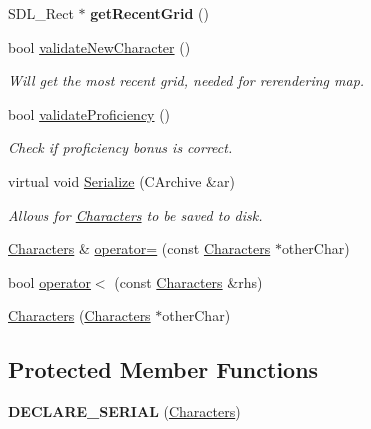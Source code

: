 \begin{DoxyCompactItemize}
S\+D\+L\+\_\+\+Rect $\ast$ {\bfseries get\+Recent\+Grid} ()
\item 
bool \hyperlink{class_characters_a1273e2d7fe2e959cd3ed513c5717f6b7}{validate\+New\+Character} ()
\begin{DoxyCompactList}\small\item\em Will get the most recent grid, needed for rerendering map. \end{DoxyCompactList}\item 
\hypertarget{class_characters_a8a13cb967bd25662f86eac505e3e874a}{}\label{class_characters_a8a13cb967bd25662f86eac505e3e874a} 
bool \hyperlink{class_characters_a8a13cb967bd25662f86eac505e3e874a}{validate\+Proficiency} ()
\begin{DoxyCompactList}\small\item\em Check if proficiency bonus is correct. \end{DoxyCompactList}\item 
\hypertarget{class_characters_ad8eafe3c0b8b2138dc28f4d52050d434}{}\label{class_characters_ad8eafe3c0b8b2138dc28f4d52050d434} 
virtual void \hyperlink{class_characters_ad8eafe3c0b8b2138dc28f4d52050d434}{Serialize} (C\+Archive \&ar)
\begin{DoxyCompactList}\small\item\em Allows for \hyperlink{class_characters}{Characters} to be saved to disk. \end{DoxyCompactList}\item 
\hyperlink{class_characters}{Characters} \& \hyperlink{class_characters_a161bd4230b1ff594c36db697ee2d3707}{operator=} (const \hyperlink{class_characters}{Characters} $\ast$other\+Char)
\item 
bool \hyperlink{class_characters_ac44afaf70aa3ed022c4af4b1f1d56f9a}{operator$<$} (const \hyperlink{class_characters}{Characters} \&rhs)
\item 
\hyperlink{class_characters_a695ed5b59463f54d4eb52a551a25949b}{Characters} (\hyperlink{class_characters}{Characters} $\ast$other\+Char)
\end{DoxyCompactItemize}
\subsection*{Protected Member Functions}
\begin{DoxyCompactItemize}
\item 
\hypertarget{class_characters_ad71f0049d5bcf2d9c67278c237ad441b}{}\label{class_characters_ad71f0049d5bcf2d9c67278c237ad441b} 
{\bfseries D\+E\+C\+L\+A\+R\+E\+\_\+\+S\+E\+R\+I\+AL} (\hyperlink{class_characters}{Characters})
\end{DoxyCompactItemize}
